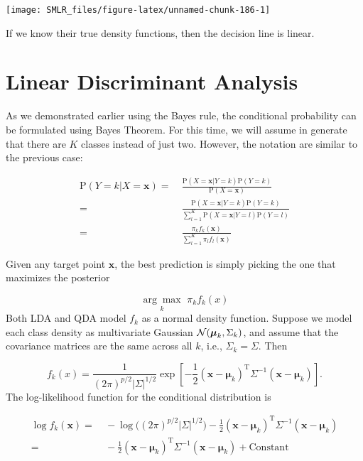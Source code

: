 \documentclass[
]{book}
\theoremstyle{definition}
\theoremstyle{definition}
\theoremstyle{definition}
\theoremstyle{definition}
\theoremstyle{remark}
\begin{document}
\begin{center}\texttt{[image: SMLR\_files/figure-latex/unnamed-chunk-186-1]} \end{center}

If we know their true density functions, then the decision line is linear.

\hypertarget{linear-discriminant-analysis}{%
\section{Linear Discriminant Analysis}\label{linear-discriminant-analysis}}

As we demonstrated earlier using the Bayes rule, the conditional probability can be formulated using Bayes Theorem. For this time, we will assume in generate that there are \(K\) classes instead of just two. However, the notation are similar to the previous case:

\begin{align}
\text{P}(Y = k | X = \mathbf{x}) =&~ \frac{\text{P}(X = \mathbf{x}| Y = k)\text{P}(Y = k)}{\text{P}(X = \mathbf{x})}\\
                     =&~ \frac{\text{P}(X = \mathbf{x}| Y = k)\text{P}(Y = k)}{\sum_{l=1}^K \text{P}(X = \mathbf{x}| Y = l) \text{P}(Y = l)}\\
                     =&~ \frac{\pi_k f_k(\mathbf{x})}{\sum_{l=1}^K \pi_l f_l(\mathbf{x})}
\end{align}

Given any target point \(\mathbf{x}\), the best prediction is simply picking the one that maximizes the posterior

\[\underset{k}{\arg\max} \,\, \pi_k f_k(x)\]
Both LDA and QDA model \(f_k\) as a normal density function. Suppose we model each class density as multivariate Gaussian \({\cal N}(\boldsymbol \mu_k, \Sigma_k)\), and \alert{assume that the covariance matrices are the same across all $k$, i.e., $\Sigma_k = \Sigma$}. Then

\[f_k(x) = \frac{1}{(2\pi)^{p/2} |\Sigma|^{1/2}} \exp\left[ -\frac{1}{2} (\mathbf{x}- \boldsymbol \mu_k)^\text{T}\Sigma^{-1} (\mathbf{x}- \boldsymbol \mu_k) \right].\]
The log-likelihood function for the conditional distribution is

\begin{align}
\log f_k(\mathbf{x}) =&~ -\log \big((2\pi)^{p/2} |\Sigma|^{1/2} \big) - \frac{1}{2} (\mathbf{x}- \boldsymbol \mu_k)^\text{T}\Sigma^{-1} (\mathbf{x}- \boldsymbol \mu_k) \\
    =&~ - \frac{1}{2} (\mathbf{x}- \boldsymbol \mu_k)^\text{T}\Sigma^{-1} (\mathbf{x}- \boldsymbol \mu_k) + \text{Constant}
\end{align}
\end{document}
